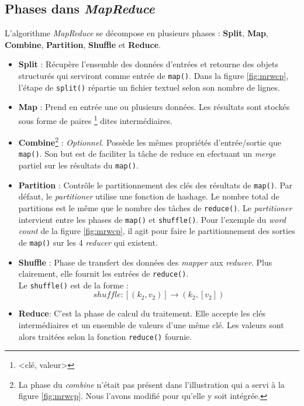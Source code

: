 \subsection{Phases dans {\it MapReduce}}
L'algorithme {\it MapReduce} se décompose en plusieurs phases : {\bf Split}, {\bf Map}, {\bf Combine}, {\bf Partition}, {\bf Shuffle} et {\bf Reduce}.\\
\begin{itemize}
\item {\bf Split} : Récupère l'ensemble des données d'entrées et retourne des objets structurés qui serviront comme entrée de {\tt map()}. Dans la figure \ref{fig:mrwcp}, l'étape de {\tt split()} répartie un fichier textuel selon son nombre de lignes.

\item {\bf Map} : Prend en entrée une ou plusieurs données. Les résultats sont stockés sous forme de paires {\tt <key, value>}\footnote{<clé, valeur>} dites intermédiaires.

\item {\bf Combine}\footnote{La phase du {\it combine} n'était pas présent dans l'illustration qui a servi à la figure \ref{fig:mrwcp}. Nous l'avons modifié pour qu'elle y soit intégrée.} : {\it Optionnel.} Possède les mêmes propriétés d'entrée/sortie que {\tt map()}. Son but est de faciliter la tâche de reduce en efectuant un {\it merge} partiel\cite{Google} sur les résultats du {\tt map()}.\\

\item {\bf Partition} : Contrôle le partitionnement des clés des résultats de {\tt map()}. Par défaut, le {\it partitioner} utilise une fonction de hashage. Le nombre total de partitions est le même que le nombre des tâches de {\tt reduce()}. Le {\it partitioner} intervient entre les phases de {\tt map()} et {\tt shuffle()}. Pour l'exemple du {\it word count} de la figure \ref{fig:mrwcp}, il agit pour faire le partitionnement des sorties de {\tt map()} sur les 4 {\it reducer} qui existent.

\item {\bf Shuffle} : Phase de transfert des données des {\it mapper} aux {\it reducer}. Plus clairement, elle fournit les entrées de {\tt reduce()}.\\
Le {\tt shuffle()} est de la forme :
\[  shuffle:[(k_2,v_2)] \rightarrow (k_2,[v_2]) \]

\item {\bf Reduce}: C'est la phase de calcul du traitement. Elle accepte les clés intermédiaires et un ensemble de valeurs d'une même clé. Les valeurs sont alors traitées selon la fonction {\tt reduce()} fournie.\\
\end{itemize}

